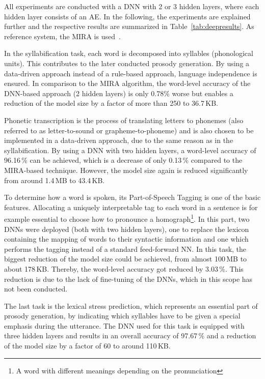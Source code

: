 All experiments are conducted with a \ac{DNN} with 2 or 3 hidden layers, where each hidden layer consists of an \acf{AE}.
In the following, the experiments are explained further and the respective results are summarized in Table~\ref{tab:deepresults}. As reference system, the \ac{MIRA} is used~\cite{boros:mira}.

In the syllabification task, each word is decomposed into syllables (phonological units). This contributes to the later conducted prosody generation. By using a data-driven approach instead of a rule-based approach, language independence is ensured. In comparison to the \ac{MIRA} algorithm, the word-level accuracy of the \ac{DNN}-based approach (2 hidden layers) is only 0.78\% worse but enables a reduction of the model size by a factor of more than 250 to 36.7\,KB.

Phonetic transcription is the process of translating letters to phonemes (also referred to as letter-to-sound or grapheme-to-\break phoneme) and is also chosen to be implemented in a data-driven approach, due to the same reason as in the syllabification. By using a \ac{DNN} with two hidden layers, a word-level accuracy of 96.16\,\% can be achieved, which is a decrease of only 0.13\,\% compared to the \ac{MIRA}-based technique. However, the model size again is reduced significantly from around 1.4\,MB to 43.4\,KB.

To determine how a word is spoken, its Part-of-Speech Tagging is one of the basic features. Allocating a uniquely interpretable tag to each word in a sentence is for example essential to choose how to pronounce a homograph\footnote{A word with different meanings depending on the pronunciation}. In this part, two \acp{DNN} were deployed (both with two hidden layers), one to replace the lexicon containing the mapping of words to their syntactic information and one which performs the tagging instead of a standard feed-forward \ac{NN}. In this task, the biggest reduction of the model size could be achieved, from almost 100\,MB to about 178\,KB. Thereby, the word-level accuracy got reduced by 3.03\,\%. This reduction is due to the lack of fine-tuning of the \acp{DNN}, which in this scope has not been conducted.

The last task is the lexical stress prediction, which represents an essential part of prosody generation, by indicating which syllables have to be given a special emphasis during the utterance. The \ac{DNN} used for this task is equipped with three hidden layers and results in an overall accuracy of 97.67\,\% and a reduction of the model size by a factor of 60 to around 110\,KB.

